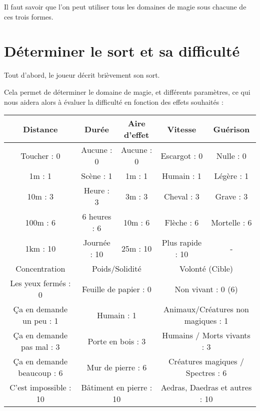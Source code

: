 Il faut savoir que l'on peut utiliser tous les domaines de magie sous chacune de ces trois formes.

\section{Déterminer le sort et sa difficulté}

Tout d'abord, le joueur décrit brièvement son sort.

Cela permet de déterminer le domaine de magie, et différents paramètres, ce qui nous aidera alors à évaluer la difficulté en fonction des effets souhaités :
\\
\begin{tabular}{|c|c|c|c|c|}
    \hline
    Distance     & Durée         & Aire d'effet & Vitesse          & Guérison      \\ \hline
    Toucher :  0 & Aucune   :  0 & Aucune  :  0 & Escargot    :  0 & Nulle    :  0 \\
    1m      :  1 & Scène    :  1 & 1m      :  1 & Humain      :  1 & Légère   :  1 \\
    10m     :  3 & Heure    :  3 & 3m      :  3 & Cheval      :  3 & Grave    :  3 \\
    100m    :  6 & 6 heures :  6 & 10m     :  6 & Flèche      :  6 & Mortelle :  6 \\
    1km     : 10 & Journée  : 10 & 25m     : 10 & Plus rapide : 10 & - \\ \hline \hline
    Concentration               & \multicolumn{2}{|c|}{Poids/Solidité         } & \multicolumn{2}{c|}{Volonté (Cible)                      } \\ \hline
    Les yeux fermés        :  0 & \multicolumn{2}{|c|}{Feuille de papier  :  0} & \multicolumn{2}{c|}{Non vivant                     :  0 (6)} \\
    Ça en demande un peu   :  1 & \multicolumn{2}{|c|}{Humain             :  1} & \multicolumn{2}{c|}{Animaux/Créatures non magiques :  1} \\
    Ça en demande pas mal  :  3 & \multicolumn{2}{|c|}{Porte en bois      :  3} & \multicolumn{2}{c|}{Humains / Morts vivants        :  3} \\
    Ça en demande beaucoup :  6 & \multicolumn{2}{|c|}{Mur de pierre      :  6} & \multicolumn{2}{c|}{Créatures magiques / Spectres  :  6} \\
    C'est impossible       : 10 & \multicolumn{2}{|c|}{Bâtiment en pierre : 10} & \multicolumn{2}{c|}{Aedras, Daedras et autres      : 10} \\ \hline
\end{tabular}

